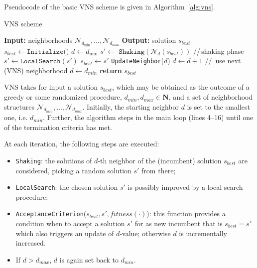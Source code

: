 \documentclass[dvipsnames,format=sigconf,anonymous=true,review=true]{acmart}
\begin{document}
  Pseudocode of the basic VNS scheme is given in Algorithm~\ref{alg:vns}.
  
     \begin{algorithm}[!t] 
  	\caption{VNS scheme}\label{alg:vns}
  	\begin{algorithmic}[1]
  		\STATE \textbf{Input:} neighborhoods  $\mathcal{N}_{d_{\min}},\ldots, \mathcal{N}_{d_{\max}}$ 
  		\STATE \textbf{Output:}   solution $s_{best}$
  		\STATE  $s_{best} \gets \texttt{Initialize()}$ 
  		\STATE $d \gets  d_{\min}$
  		\STATE  $s' \gets$  $\texttt{Shaking}(\mathcal{N}_d(s_{best}))$ \hspace{0.3cm}//\,shaking phase
  		\STATE $s' \gets  \texttt{LocalSearch}(s {'})$
  	    \STATE $s _{best}\gets s'$
  	 	\STATE \texttt{UpdateNeighbor}($d$) %
  		\ELSE 
  		\STATE $d \gets d + 1$ \hspace{0.3cm}//\, use next (VNS) neighborhood
  		\STATE $d\gets d_{min}$
  		\ENDIF
  		\ENDIF
  		\ENDWHILE
  		\STATE \textbf{return} $s_{best}$
  	\end{algorithmic}
  \end{algorithm}

 VNS takes for input a solution $s_{best}$, which may be obtained as the outcome of a greedy or some randomized procedure, $d_{min}, d_{max} \in \mathbf{N}$, 
  and a set of neighborhood structures $\mathcal{N}_{d_{min}}, \ldots, \mathcal{N}_{d_{max}}$.  
  Initially, the starting neighbor $d$ is set to the smallest one, i.e. $d_{min}$. Further, the algorithm steps in the main loop (lines 4--16) until one of the termination criteria has met.
 
   At each iteration, the following steps are executed: %
  
  \begin{itemize}
  	\item \texttt{Shaking}: the solutions of $d$-th neighbor of the (incumbent) solution $s_{best}$ are considered, picking a random solution $s'$ from there;
  	\item  \texttt{LocalSearch}: the chosen solution $s'$ is possibly improved by a local search procedure;
  	\item \texttt{AcceptanceCriterion}($s_{best}, s', fitness(\cdot)$):  this function provides a condition when to accept a solution $s'$ for as new incumbent that is $s_{best} = s'$ which also triggers an update of $d$-value; otherwise $d$ is incrementally increased. 
  	\item  If $d> d_{max}$, $d$ is again set back to $d_{min}$.
   \end{itemize}
    
\end{document}
